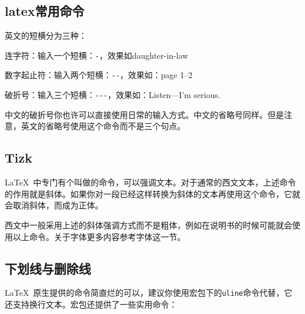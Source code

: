 \subsection{latex常用命令}
英文的短横分为三种：
\begin{feai}
\item 连字符：输入一个短横：\verb|-|，效果如daughter-in-law
\item 数字起止符：输入两个短横：\verb|--|，效果如：page 1--2
\item 破折号：输入三个短横：\verb|---|，效果如：Listen---I'm serious.
\end{feai}

中文的破折号你也许可以直接使用日常的输入方式。中文的省略号同样。但是注意，英文的省略号使用这个命令而不是三个句点。
\subsection{Tizk}
\LaTeX\ 中专门有个叫做的命令，可以强调文本。对于通常的西文文本，上述命令的作用就是斜体。如果你对一段已经这样转换为斜体的文本再使用这个命令，它就会取消斜体，而成为正体。

西文中一般采用上述的斜体强调方式而不是粗体，例如在说明书的时候可能就会使用以上命令。关于字体更多内容参考字体这一节。

\subsection{下划线与删除线}
\LaTeX\ 原生提供的命令简直烂的可以，建议你使用宏包下的\texttt{uline}命令代替，它还支持换行文本。宏包还提供了一些实用命令：
